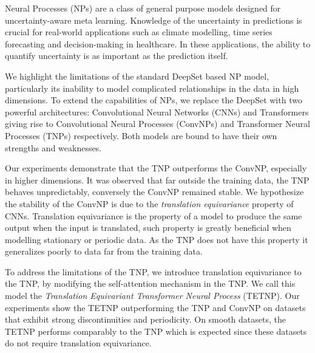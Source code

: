 \documentclass[../../main.tex]{subfiles}
\begin{document}

Neural Processes (NPs) are a class of general purpose models designed for uncertainty-aware meta learning.  Knowledge of the uncertainty in predictions is crucial for real-world applications such as climate modelling, time series forecasting and decision-making in healthcare. In these applications, the ability to quantify uncertainty is as important as the prediction itself. 

We highlight the limitations of the standard DeepSet based NP model, particularly its inability to model complicated relationships in the data in high dimensions. To extend the capabilities of NPs, we replace the DeepSet with two powerful architectures: Convolutional Neural Networks (CNNs) and Transformers giving rise to Convolutional Neural Processes (ConvNPs) and Transformer Neural Processes (TNPs) respectively. Both models are bound to have their own strengths and weaknesses. 

Our experiments demonstrate that the TNP outperforms the ConvNP, especially in higher dimensions. It was observed that far outside the training data, the TNP behaves unpredictably, conversely the ConvNP remained stable. We hypothesize the stability of the ConvNP is due to the \emph{translation equivariance} property of CNNs. Translation equivariance is the property of a model to produce the same output when the input is translated, such property is greatly beneficial when modelling stationary or periodic data.  As the TNP does not have this property it generalizes poorly to data far from the training data. 

To address the limitations of the TNP, we introduce translation equivariance to the TNP, by modifying the self-attention mechanism in the TNP. We call this model the \emph{Translation Equivariant Transformer Neural Process} (TETNP). Our experiments show the TETNP  outperforming the TNP and ConvNP on datasets that exhibit strong discontinuities and periodicity. On smooth datasets, the TETNP performs comparably to the TNP which is expected since these datasets do not require translation equivariance.
\end{document}
